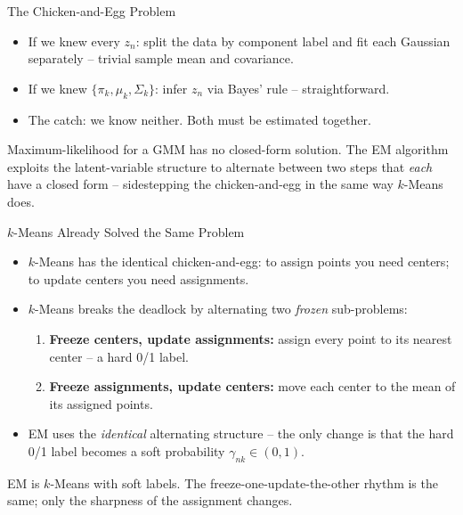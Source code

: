 \begin{frame}{The Chicken-and-Egg Problem}
\begin{itemize}
  \item If we knew every $z_n$: split the data by component label and fit each Gaussian separately -- trivial sample mean and covariance.
  \pause
  \item If we knew $\{\pi_k, \mu_k, \Sigma_k\}$: infer $z_n$ via Bayes' rule -- straightforward.
  \pause
  \item The catch: we know neither.  Both must be estimated together.
\end{itemize}
\pause
\begin{rlpitfall}
  Maximum-likelihood for a GMM has no closed-form solution. The EM algorithm exploits the latent-variable structure to alternate between two steps that \emph{each} have a closed form -- sidestepping the chicken-and-egg in the same way $k$-Means does.
\end{rlpitfall}
\end{frame}

\begin{frame}{$k$-Means Already Solved the Same Problem}
\begin{itemize}
  \item $k$-Means has the identical chicken-and-egg: to assign points you need centers; to update centers you need assignments.
  \pause
  \item $k$-Means breaks the deadlock by alternating two \emph{frozen} sub-problems:
  \begin{enumerate}
    \item \textbf{Freeze centers, update assignments:} assign every point to its nearest center -- a hard 0/1 label.
    \item \textbf{Freeze assignments, update centers:} move each center to the mean of its assigned points.
  \end{enumerate}
  \pause
  \item EM uses the \emph{identical} alternating structure -- the only change is that the hard 0/1 label becomes a soft probability $\gamma_{nk} \in (0,1)$.
\end{itemize}
\pause
\begin{rlintuition}
  EM is $k$-Means with soft labels.  The freeze-one-update-the-other rhythm is the same; only the sharpness of the assignment changes.
\end{rlintuition}
\end{frame}

